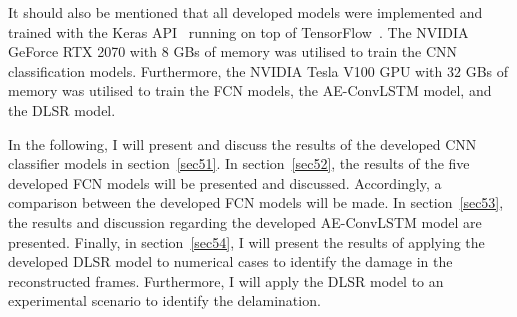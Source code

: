 It should also be mentioned that all developed models were implemented and trained with the Keras API~\cite{chollet2015keras} running on top of TensorFlow~\cite{Abadi2016}.
The NVIDIA GeForce RTX 2070 with \(8\) GBs of memory was utilised to train the CNN classification models.
Furthermore, the NVIDIA Tesla V100 GPU with \(32\) GBs of memory was utilised to train the FCN models, the AE-ConvLSTM model, and the DLSR model.

In the following, I will present and discuss the results of the developed CNN classifier models in section~\ref{sec51}. 
In section~\ref{sec52}, the results of the five developed FCN models will be presented and discussed.
Accordingly, a comparison between the developed FCN models will be made.
In section~\ref{sec53}, the results and discussion regarding the developed AE-ConvLSTM model are presented.
Finally, in section~\ref{sec54}, I will present the results of applying the developed DLSR model to numerical cases to identify the damage in the reconstructed frames.
Furthermore, I will apply the DLSR model to an experimental scenario to identify the delamination.





